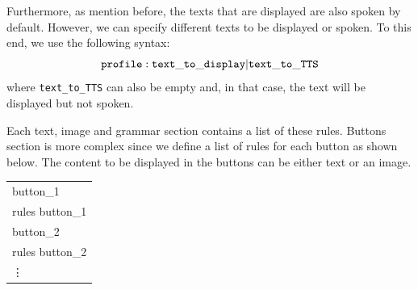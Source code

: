 \documentclass[11pt,a4paper]{article}
\begin{document}
Furthermore, as mention before, the texts that are displayed are also spoken by default. However, we can specify different texts to be displayed or spoken. To this end, we use the following syntax:
\[\tt profile : text\_to\_display | text\_to\_TTS \]
where {\tt text\_to\_TTS} can also be empty and, in that case, the text will be displayed but not spoken.

Each text, image and grammar section contains a list of these rules. Buttons section is more complex since we define a list of rules for each button as shown below. The content to be displayed in the buttons can be either text or an image.
{\ttfamily
\begin{center}
  \begin{tabular}{|l|}
    \hline
button\_1\\
rules button\_1\\
button\_2\\
rules button\_2\\
\vdots\\
    \hline
  \end{tabular}
\end{center}
}
\end{document}

